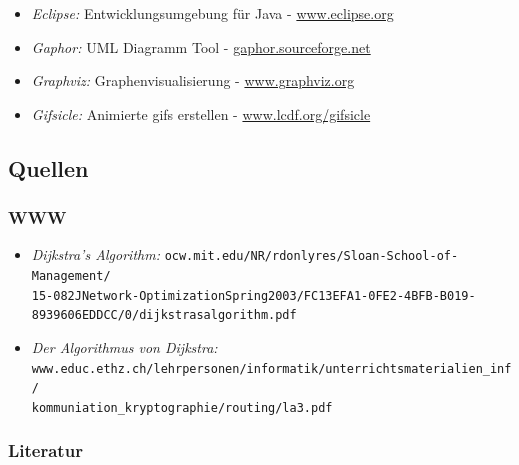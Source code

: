 \documentclass[a4paper,titlepage]{article}
\begin{document}
\begin{itemize}
\item \emph{Eclipse:} Entwicklungsumgebung für Java - \url{www.eclipse.org}
\item \emph{Gaphor:} UML Diagramm Tool - \url{gaphor.sourceforge.net}
\item \emph{Graphviz:} Graphenvisualisierung - \url{www.graphviz.org}
\item \emph{Gifsicle:} Animierte gifs erstellen - \url{www.lcdf.org/gifsicle}
\end{itemize}

\subsection{Quellen}

\subsubsection{WWW}

\begin{itemize}
\item \emph{Dijkstra’s Algorithm:} {\small\texttt{ocw.mit.edu/NR/rdonlyres/Sloan-School-of-Management/ \\ 15-082JNetwork-OptimizationSpring2003/FC13EFA1-0FE2-4BFB-B019-8939606EDDCC/0/dijkstrasalgorithm.pdf}}
\item \emph{Der Algorithmus von Dijkstra:} {\small\texttt{www.educ.ethz.ch/lehrpersonen/informatik/unterrichtsmaterialien\_inf/ \\ kommuniation\_kryptographie/routing/la3.pdf}}
\end{itemize}

\subsubsection{Literatur}
\end{document}
